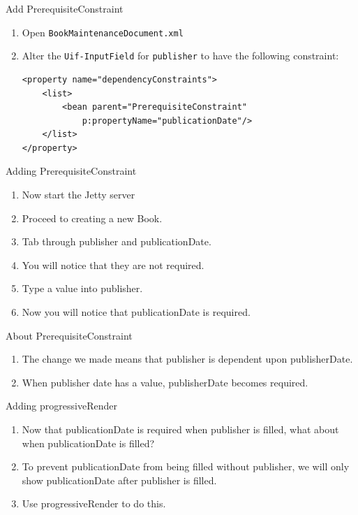 \documentclass[xcolor=dvipsnames,14pt,professionalfonts]{beamer}
\begin{document}
\begin{frame}[fragile]{Add PrerequisiteConstraint}
  \begin{enumerate}
    \item Open \texttt{BookMaintenanceDocument.xml}
    \item Alter the \texttt{Uif-InputField} for \texttt{publisher} to
      have the following constraint:
    \begin{verbatim}
<property name="dependencyConstraints">
	<list>
		<bean parent="PrerequisiteConstraint" 
            p:propertyName="publicationDate"/>
	</list>
</property>
    \end{verbatim}
  \end{enumerate}
    
\end{frame}

\begin{frame}{Adding PrerequisiteConstraint}
  \begin{enumerate}
    \item Now start the Jetty server
    \item Proceed to creating a new Book.
    \item Tab through publisher and publicationDate.
    \item You will notice that they are not required.
    \item Type a value into publisher.
    \item Now you will notice that publicationDate is required.
  \end{enumerate}
\end{frame}

\begin{frame}{About PrerequisiteConstraint}
  \begin{enumerate}
    \item The change we made means that publisher is dependent upon publisherDate.
    \item When publisher date has a value, publisherDate becomes required.
  \end{enumerate}
\end{frame}

\begin{frame}{Adding progressiveRender}
  \begin{enumerate}
    \item Now that publicationDate is required when publisher is filled,
      what about when publicationDate is filled?
    \item To prevent publicationDate from being filled without
      publisher, we will only show publicationDate after publisher is
      filled.
    \item Use progressiveRender to do this.
  \end{enumerate}
\end{frame}
\end{document}
